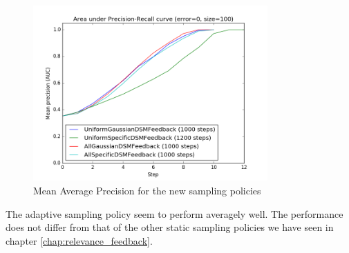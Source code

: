 \begin{figure}[h!]
  \centering
  \includegraphics[width=0.8\textwidth]{otago}
  \caption{Mean Average Precision for the new sampling policies}
  \label{fig:pms_grand}
\end{figure}

The adaptive sampling policy seem to perform averagely well. The performance does not differ from that of the other static sampling policies we have seen in chapter \ref{chap:relevance_feedback}.

